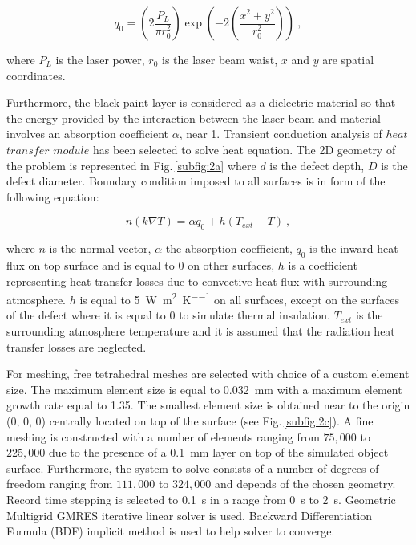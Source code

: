 \documentclass[12pt]{spieman}
\begin{document}
\begin{spacing}{2}
\begin{equation}
  \label{eq:2}
  q_0 = \left( 2 \frac{P_L}{\pi r_{0}^{2}} \right) \exp \left( -2 \left( \frac{x^2 + y^2}{r_{0}^{2}} \right) \right) \ ,
\end{equation}

\noindent where $P_L$ is the laser power, $r_0$ is the laser beam waist, $x$ and $y$ are spatial coordinates.
%

Furthermore, the black paint layer is considered as a dielectric material so that the energy provided by the interaction between the laser beam and material involves an absorption coefficient $\alpha$, near 1.
Transient conduction analysis of $heat$ $transfer$ $module$ has been selected to solve heat equation. The 2D geometry of the problem is represented in Fig.\,\ref{subfig:2a} where $d$ is the defect depth, $D$ is the defect diameter. Boundary condition imposed to all surfaces is in form of the following equation:

\begin{equation}
  \label{eq:33}
  n(k \nabla T) = \alpha q_0 + h(T_{ext} - T) \ ,
\end{equation}

\noindent where $n$ is the normal vector, $\alpha$ the absorption coefficient, $q_0$ is the inward heat flux on top surface and is equal to 0 on other surfaces, $h$ is a coefficient representing heat transfer losses due to convective heat flux with surrounding atmosphere. $h$ is equal to \SI{5}{\watt \per \square \metre \per \kelvin} on all surfaces, except on the surfaces of the defect where it is equal to 0 to simulate thermal insulation. $T_{ext}$ is the surrounding atmosphere temperature and it is assumed that the radiation heat transfer losses are neglected. 

For meshing, free tetrahedral meshes are selected with choice of a custom element size. The maximum element size is equal to \SI{0.032}{\milli \metre} with a maximum element growth rate equal to 1.35. The smallest element size is obtained near to the origin (0, 0, 0) centrally located on top of the surface (see Fig.\,\ref{subfig:2c}). A fine meshing is constructed with a number of elements ranging from $75,000$ to $225,000$ due to the presence of a \SI{0.1}{\milli \metre} layer on top of the simulated object surface. Furthermore, the system to solve consists of a number of degrees of freedom ranging from $111,000$ to $324,000$ and depends of the chosen geometry. Record time stepping is selected to \SI{0.1}{\second} in a range from \SI{0}{\second} to \SI{2}{\second}. Geometric Multigrid GMRES iterative linear solver is used. Backward Differentiation Formula (BDF) implicit method is used to help solver to converge.


\end{spacing}
\end{document}

